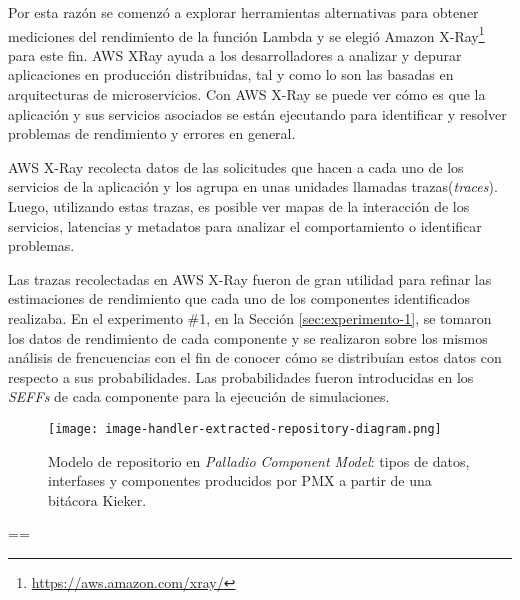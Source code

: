 Por esta razón se comenzó a explorar herramientas alternativas para obtener mediciones del rendimiento de la función Lambda y se elegió Amazon X-Ray\footnote{\url{https://aws.amazon.com/xray/}} para este fin. AWS XRay ayuda a los desarrolladores a analizar y depurar aplicaciones en producción distribuidas, tal y como lo son las basadas en arquitecturas de microservicios. Con AWS X-Ray se puede ver cómo es que la aplicación y sus servicios asociados se están ejecutando para identificar y resolver problemas de rendimiento y errores en general.

AWS X-Ray recolecta datos de las solicitudes que hacen a cada uno de los servicios de la aplicación y los agrupa en unas unidades llamadas trazas(\emph{traces}). Luego, utilizando estas trazas, es posible ver mapas de la interacción de los servicios, latencias y metadatos para analizar el comportamiento o identificar problemas.


Las trazas recolectadas en AWS X-Ray fueron de gran utilidad para refinar las estimaciones de rendimiento que cada uno de los componentes identificados realizaba. En el experimento \#1, en la Sección \ref{sec:experimento-1}, se tomaron los datos de rendimiento de cada componente y se realizaron sobre los mismos análisis de frencuencias con el fin de conocer cómo se distribuían estos datos con respecto a sus probabilidades. Las probabilidades fueron introducidas en los \emph{SEFFs} de cada componente para la ejecución de simulaciones.   



\eject \pdfpagewidth=28in \pdfpageheight=23in
\begin{landscape}
\thispagestyle{empty}
\begin{figure}[htb]
  \vspace*{3cm} 
  \hspace{-33cm} 
  \centering
  \texttt{[image: image-handler-extracted-repository-diagram.png]}
  \caption[\hspace{0.2cm} Modelo de repositorio en \emph{Palladio Component Model}]{Modelo de repositorio en \emph{Palladio Component Model}: tipos de datos, interfases y componentes producidos por PMX a partir de una bitácora Kieker.}
  \label{fig:image-handler-pcm-model}
\end{figure}
\end{landscape}




\eject \pdfpagewidth=\paperwidth \pdfpageheight=\paperheight



